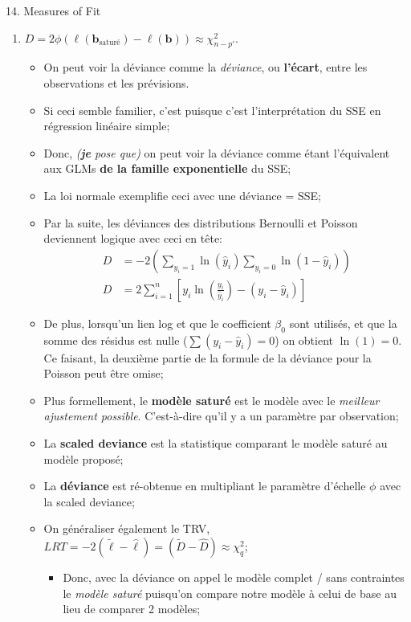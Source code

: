 \documentclass[12pt, titlepage, french]{report}
\begin{document}
\begin{CHPT_SUMM}{14. Measures of Fit}
\begin{enumerate}
	\item[]	$D = 2 \phi \left( \ell(\bm{b}_{\text{saturé}}) - \ell(\bm{b}) \right) \approx \chi^{2}_{n - p'}$.
	\begin{itemize}
		\item	On peut voir la déviance comme la \textit{déviance}, ou \textbf{l'écart}, entre les observations et les prévisions. 
		\item[]	Si ceci semble familier, c'est puisque c'est l'interprétation du SSE en régression linéaire simple;
		\item[]	Donc, \textit{(\textbf{je} pose que)} on peut voir la déviance comme étant l'équivalent aux GLMs \textbf{de la famille exponentielle} du SSE;
		\item	La loi normale exemplifie ceci avec une déviance = SSE;
		\item	Par la suite, les déviances des distributions Bernoulli et Poisson deviennent logique avec ceci en tête:
		\begin{align*}
			D	&=	-2 \left( \underset{y_{i} = 1}{\sum} \ln(\hat{y}_{i}) \underset{y_{i} = 0}{\sum} \ln(1 - \hat{y}_{i}) \right)	\\
			D	&=	2 \sum_{i = 1}^{n} \left[ y_{i} \ln \left( \frac{y_{i}}{\hat{y}_{i}} \right) - (y_{i} - \hat{y}_{i}) \right]
		\end{align*}
		\item[]	De plus, lorsqu'un lien log et que le coefficient $\beta_{0}$ sont utilisés, et que la somme des résidus est nulle ($\sum (y_{i} - \hat{y}_{i}) = 0$) on obtient $\ln(1) = 0$. Ce faisant, la deuxième partie de la formule de la déviance pour la Poisson peut être omise;
		\item	Plus formellement, le \textbf{modèle saturé} est le modèle avec le \textit{meilleur ajustement possible}. C'est-à-dire qu'il y a un paramètre par observation;
		\item	La \textbf{scaled deviance} est la statistique comparant le modèle saturé au modèle proposé;
		\item	La \textbf{déviance} est ré-obtenue en multipliant le paramètre d'échelle $\phi$ avec la scaled deviance;
	\item On généraliser également le TRV, $LRT = -2(\tilde{\ell} - \hat{\ell}) = (\tilde{D} - \hat{D}) \approx	\chi_{q}^{2}$;
		\begin{itemize}
			\item	Donc, avec la déviance on appel le modèle complet / sans contraintes le \textit{modèle saturé} puisqu'on compare notre modèle à celui de base au lieu de comparer 2 modèles;

\end{itemize}
\end{itemize}
\end{enumerate}
\end{CHPT_SUMM}
\end{document}
